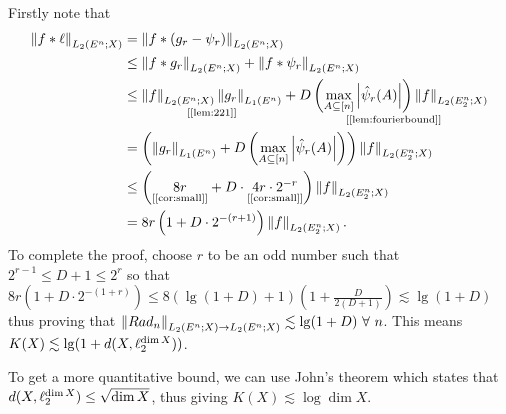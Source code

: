 Firstly note that 
\begin{align*}
\norm{f\ast \l}{L_{2}(E^{n};X)} &= \norm{f\ast (g_{r}-\psi_{r})}{L_{2}(E^{n};X)}\\
&\le \norm{f\ast g_{r}}{L_{2}(E^{n};X)} + \norm{f\ast \psi_{r}}{L_{2}(E^{n};X)} \\
&\le \underset{\left[\text{\cref{lem:221}}\right]}{\norm{f}{L_{2}(E^{n};X)}\norm{g_{r}}{L_{1}(E^{n})}} + \underset{\left[\text{\cref{lem:fourierbound}}\right]}{D \left(\max_{A\subseteq[n]}\abs{\hat \psi_{r}(A)} \right)\norm{f}{L_{2}(E_{2}^{n};X)}}\\
&= \left(\norm{g_{r}}{L_{1}(E^{n})} + D \left(\max_{A\subseteq[n]}\abs{\hat \psi_{r}(A)} \right)\right)\norm{f}{L_{2}(E_{2}^{n};X)}\\
&\le \left(\underset{\left[\text{\cref{cor:small}}\right]}{8r} + D\cdot \underset{\left[\text{\cref{cor:small}}\right]}{4r\cdot2^{-r}}\right)\norm{f}{L_{2}(E_{2}^{n};X)}\\
&= 8r\left(1+D\cdot 2^{-(r+1)}\right)\norm{f}{L_{2}(E_{2}^{n};X)}.
\end{align*}
To complete the proof, choose $r$ to be an odd number such that $2^{r-1}\le D + 1 \le 2^{r}$ so that $8r(1+D\cdot 2^{-(1+r)}) \le 8\left(\lg(1+D) + 1\right)\left(1+\frac{D}{2(D+1)}\right) \lesssim \lg(1+D)$ thus proving that $\left\lVert Rad_{n} \right\rVert_{L_{2}(E^{n};X) \to L_{2}(E^{n};X)} \lesssim \lg(1+D)~\forall~ n$. This means $K(X) \lesssim \lg(1+d(X,\ell_{2}^{\dim X}))$.

To get a more quantitative bound, we can use John's theorem which states that $d(X,\ell_{2}^{\dim X}) \le \sqrt{\dim X}$, thus giving $K(X)\lesssim \log \dim X$.



\newpage
\appendix
\section{}\label{app}

